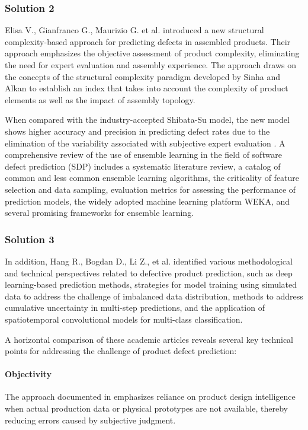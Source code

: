 \documentclass[conference]{IEEEtran}
\begin{document}
\subsubsection{Solution 2}
Elisa V., Gianfranco G., Maurizio G. et al. \cite{verna2022defect} introduced a new structural complexity-based approach for predicting defects in assembled products. Their approach emphasizes the objective assessment of product complexity, eliminating the need for expert evaluation and assembly experience. The approach draws on the concepts of the structural complexity paradigm developed by Sinha and Alkan to establish an index that takes into account the complexity of product elements as well as the impact of assembly topology.

When compared with the industry-accepted Shibata-Su model, the new model shows higher accuracy and precision in predicting defect rates due to the elimination of the variability associated with subjective expert evaluation \cite{verna2022defect}. A comprehensive review of the use of ensemble learning in the field of software defect prediction (SDP) \cite{matloob2021software} includes a systematic literature review, a catalog of common and less common ensemble learning algorithms, the criticality of feature selection and data sampling, evaluation metrics for assessing the performance of prediction models, the widely adopted machine learning platform WEKA, and several promising frameworks for ensemble learning.

\subsubsection{Solution 3}
In addition, Hang R., Bogdan D., Li Z., et al. \cite{ruan2022deep} identified various methodological and technical perspectives related to defective product prediction, such as deep learning-based prediction methods, strategies for model training using simulated data to address the challenge of imbalanced data distribution, methods to address cumulative uncertainty in multi-step predictions, and the application of spatiotemporal convolutional models for multi-class classification.

A horizontal comparison of these academic articles reveals several key technical points for addressing the challenge of product defect prediction:

\paragraph{Objectivity}
The approach documented in \cite{verna2022defect} emphasizes reliance on product design intelligence when actual production data or physical prototypes are not available, thereby reducing errors caused by subjective judgment.
\end{document}
